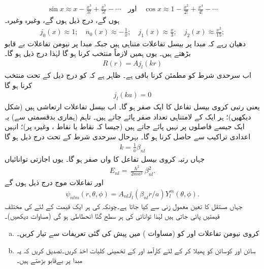 \begin{align*}
\sin x\approx x-\frac{x^{3}}{3!}+\frac{x^{5}}{5!}-\dotsb\quad \text{اور}\quad  \cos x \approx 1-\frac{x^{2}}{2!}+\frac{x^{4}}{4!}-\dotsb
\end{align*}
 ہوں گے، درج ذیل ہوں گے، وغیرہ وغیرہ۔
\begin{align*}
j_{0}(x)\approx1;\quad{n_{0}(x)\approx-\frac{1}{x}};\quad{j_{1}(x)\approx\frac{x}{3}};\quad{j_{2}(x)\approx\frac{x^{2}}{15}}; 
\end{align*}
 دھیان رہے کہ مبدا  پر بیسل تفاعلات متناہی  ہیں جبکہ مبدا پر نیومن تفاعلات بے قابو بڑھتے ہیں۔ یوں ہمیں لازماً   منتخب کرنا ہو گا لہٰذا درج ذیل ہو گا۔
\begin{align}
R(r)=Aj_{l}(kr) 
\end{align}
اب سرحدی شرط  کو مطمئن کرنا باقی ہے۔ ظاہر ہے کہ  کو درج ذیل کے تحت منتخب کرنا ہو گا
\begin{align}
j_{l}(ka)=0
\end{align}
یعنی  رتبی کروی بیسل تفاعل کا  ایک صفر ہو گا۔ اب بیسل تفاعلات ارتعاشی ہیں (شکل  دیکھیں)؛ ہر ایک کے لامتناہی تعداد  صفر پائے جاتے ہیں۔ تاہم (ہماری بدقسمتی سے) یہ ایک جیسے فاصلوں پر نہیں پائے جاتے ہیں (جیسا کہ نقاط  یا نقاط
، وغیرہ پر)؛ انہیں اعدادی تراکیب سے حاصل کرنا ہو گا۔ بہرحال سرحدی شرط کے تحت درج ذیل ہو گا
\begin{align}
k=\frac{1}{a}\beta_{nl} 
\end{align}
جہاں  رتبہ     کروی بیسل تفاعل کا  واں صفر   ہو گا۔ یوں اجازتی توانائیاں 
\begin{align}\label{مساوات_ابعاد_کروی_کنواں_اجازتی_توانائیاں}
E_{nl}=\frac{\hslash^{2}}{2ma^{2}}\beta_{nl}^{2}. 
\end{align}
اور تفاعلات موج درج ذیل ہوں گے 
\begin{align}
\psi_{nlm}(r,\theta,\phi)=A_{nl}j_{l}(\beta_{nl}r/a)Y_{l}^{m}(\theta,\phi). 
\end{align}
جہاں مستقل  کا تعین معمول زنی سے کیا جاتا ہے۔چونکہ  کی ہر ایک قیمت کے لئے  کی 
مختلف قیمتیں پائی جاتی ہیں لہٰذا توانائی کی ہر سطح  گنّا انحطاطی ہو گی (مساوات  دیکھیں)۔
\begin{enumerate}[a.]
\item
کروی نیومن تفاعلات  اور  کو (مساوات ) میں پیش کی گئی تعریفات سے تیار کریں۔
\item
سائن اور کوسائن کو پھیلا کر  کے لئے كارآمد   اور  کے  تخمینی کلیات  اخذ کریں۔تصدیق کریں کہ یہ مبدا پر بےقابو بڑھتے ہیں۔
\end{enumerate}
